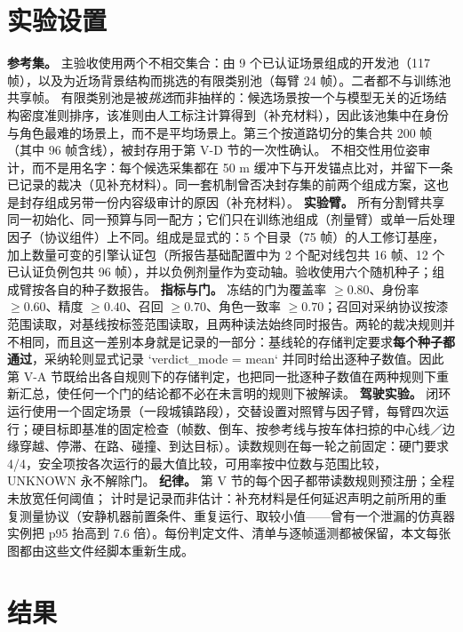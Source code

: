 \documentclass[journal]{IEEEtran}
\begin{document}
\section{实验设置}
\textbf{参考集。} 主验收使用两个不相交集合：由 9 个已认证场景组成的开发池（117 帧），以及为近场背景结构而挑选的有限类别池（每臂 24 帧）。二者都不与训练池共享帧。
有限类别池是被\emph{挑选}而非抽样的：候选场景按一个与模型无关的近场结构密度准则排序，该准则由人工标注计算得到（补充材料），因此该池集中在身份与角色最难的场景上，而不是平均场景上。第三个按道路切分的集合共 200 帧（其中 96 帧含线），被封存用于第 V-D 节的一次性确认。
不相交性用位姿审计，而不是用名字：每个候选采集都在 50 m 缓冲下与开发锚点比对，并留下一条已记录的裁决（见补充材料）。同一套机制曾否决封存集的前两个组成方案，这也是封存组成另带一份内容级审计的原因（补充材料）。
\textbf{实验臂。} 所有分割臂共享同一初始化、同一预算与同一配方；它们只在训练池组成（剂量臂）或单一后处理因子（协议组件）上不同。组成是显式的：5 个目录（75 帧）的人工修订基座，加上数量可变的引擎认证包（所报告基础配置中为 2 个配对线包共 16 帧、12 个已认证负例包共 96 帧），并以负例剂量作为变动轴。验收使用六个随机种子；组成臂按各自的种子数报告。
\textbf{指标与门。} 冻结的门为覆盖率 $\ge 0.80$、身份率 $\ge 0.60$、精度 $\ge 0.40$、召回 $\ge 0.70$、角色一致率 $\ge 0.70$；召回对采纳协议按漆范围读取，对基线按标签范围读取，且两种读法始终同时报告。两轮的裁决规则并不相同，而且这一差别本身就是记录的一部分：基线轮的存储判定要求\textbf{每个种子都通过}，采纳轮则显式记录 `verdict_mode = mean` 并同时给出逐种子数值。因此第 V-A 节既给出各自规则下的存储判定，也把同一批逐种子数值在两种规则下重新汇总，使任何一个门的结论都不必在未言明的规则下被解读。
\textbf{驾驶实验。} 闭环运行使用一个固定场景（一段城镇路段），交替设置对照臂与因子臂，每臂四次运行；硬目标即基准的固定检查（帧数、倒车、按参考线与按车体扫掠的中心线／边缘穿越、停滞、在路、碰撞、到达目标）。读数规则在每一轮之前固定：硬门要求 4/4，安全项按各次运行的最大值比较，可用率按中位数与范围比较，UNKNOWN 永不解除门。
\textbf{纪律。} 第 V 节的每个因子都带读数规则预注册；全程未放宽任何阈值；
计时是记录而非估计：补充材料是任何延迟声明之前所用的重复测量协议（安静机器前置条件、重复运行、取较小值------曾有一个泄漏的仿真器实例把 p95 抬高到 7.6 倍）。每份判定文件、清单与逐帧遥测都被保留，本文每张图都由这些文件经脚本重新生成。
\section{结果}
\end{document}
